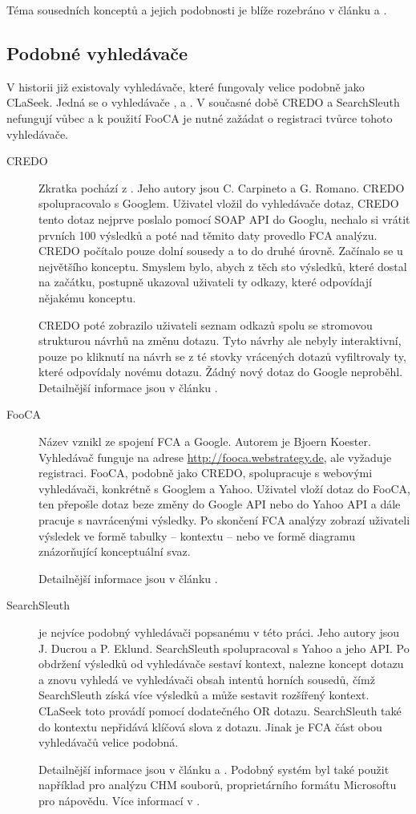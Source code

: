 \documentclass{article}
\newcommand{\name}{CLaSeek}
\newcommand{\ssection}[1]{\subsection{#1}}
\begin{document}
Téma sousedních konceptů a jejich podobnosti je blíže rozebráno v článku \cite{searchsleuth} a \cite{fcasim}.


\ssection{Podobné vyhledávače}\label{ch.fcaengines}
V historii již existovaly vyhledávače, které fungovaly velice podobně jako \name. Jedná se o vyhledávače ,  a . V současné době CREDO a SearchSleuth nefungují vůbec a k použití FooCA je nutné zažádat o registraci tvůrce tohoto vyhledávače. 

\begin{description}
	\item[CREDO] Zkratka pochází z . Jeho autory jsou C. Carpineto a G. Romano. CREDO spolupracovalo s Googlem. Uživatel vložil do vyhledávače dotaz, CREDO tento dotaz nejprve poslalo pomocí SOAP API do Googlu, nechalo si vrátit prvních 100 výsledků a poté nad těmito daty provedlo FCA analýzu. CREDO počítalo pouze dolní sousedy a to do druhé úrovně. Začínalo se u největšího konceptu. Smyslem bylo, abych z těch sto výsledků, které dostal na začátku, postupně ukazoval uživateli ty odkazy, které odpovídají nějakému konceptu. 

	CREDO poté zobrazilo uživateli seznam odkazů spolu se stromovou strukturou návrhů na změnu dotazu. Tyto návrhy ale nebyly interaktivní, pouze po kliknutí na návrh se z té stovky vrácených dotazů vyfiltrovaly ty, které odpovídaly novému dotazu. Žádný nový dotaz do Google neproběhl. Detailnější informace jsou v článku \cite{credo}.

	\item[FooCA] Název vznikl ze spojení FCA a Google. Autorem je Bjoern Koester. Vyhledávač funguje na adrese \url{http://fooca.webstrategy.de}, ale vyžaduje registraci. FooCA, podobně jako CREDO, spolupracuje s webovými vyhledávači, konkrétně s Googlem a Yahoo. Uživatel vloží dotaz do Foo\-CA, ten přepošle dotaz beze změny do Google API nebo do Yahoo API a dále pracuje s navrácenými výsledky. Po skončení FCA analýzy zobrazí uživateli výsledek ve formě tabulky -- kontextu -- nebo ve formě diagramu znázorňující konceptuální svaz. 

	Detailnější informace jsou v článku \cite{fooca}.
	\item[SearchSleuth] je nejvíce podobný vyhledávači popsanému v této práci. Jeho autory jsou J. Ducrou a P. Eklund. SearchSleuth  spolupracoval s Yahoo a jeho API. Po obdržení výsledků od vyhledávače sestaví kontext, nalezne koncept dotazu a znovu vyhledá ve vyhledávači obsah intentů horních sousedů, čímž SearchSleuth získá více výsledků a může sestavit rozšířený kontext. \name{} toto provádí pomocí dodatečného OR dotazu. SearchSleuth také do kontextu nepřidává klíčová slova z dotazu. Jinak je FCA část obou vyhledávačů velice podobná. 

	Detailnější informace jsou v článku \cite{searchsleuth} a \cite{fcasim}. Podobný systém byl také použit například pro analýzu CHM souborů, proprietárního formátu Microsoftu pro nápovědu. Více informací v \cite{helpsleuth}.
\end{description} 
\end{document}
